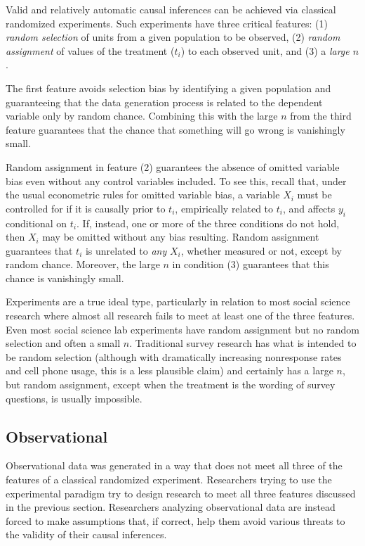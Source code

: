 \documentclass[11pt,titlepage]{article}
\begin{document}
Valid and relatively automatic causal inferences can be achieved via
classical randomized experiments.  Such experiments have three
critical features: (1) \emph{random selection} of units from a given
population to be observed, (2) \emph{random assignment} of values of
the treatment ($t_i$) to each observed unit, and (3) a \emph{large
  $n$}.  

The first feature avoids selection bias by identifying a given
population and guaranteeing that the data generation process is
related to the dependent variable only by random chance.  Combining
this with the large $n$ from the third feature guarantees that the
chance that something will go wrong is vanishingly small.

Random assignment in feature (2) guarantees the absence of omitted
variable bias even without any control variables included.  To see
this, recall that, under the usual econometric rules for omitted
variable bias, a variable $X_i$ must be controlled for if it is
causally prior to $t_i$, empirically related to $t_i$, and affects
$y_i$ conditional on $t_i$.  If, instead, one or more of the three
conditions do not hold, then $X_i$ may be omitted without any bias
resulting.  Random assignment guarantees that $t_i$ is unrelated to
\emph{any} $X_i$, whether measured or not, except by random chance.
Moreover, the large $n$ in condition (3) guarantees that this chance
is vanishingly small.

Experiments are a true ideal type, particularly in relation to most
social science research where almost all research fails to meet at
least one of the three features.  Even most social science lab
experiments have random assignment but no random selection and often a
small $n$.  Traditional survey research has what is intended to be
random selection (although with dramatically increasing nonresponse
rates and cell phone usage, this is a less plausible claim) and
certainly has a large $n$, but random assignment, except when the
treatment is the wording of survey questions, is usually impossible.

\subsection{Observational}

Observational data was generated in a way that does not meet all three
of the features of a classical randomized experiment.  Researchers
trying to use the experimental paradigm try to design research to meet
all three features discussed in the previous section.  Researchers
analyzing observational data are instead forced to make assumptions
that, if correct, help them avoid various threats to the validity of
their causal inferences.
\end{document}
